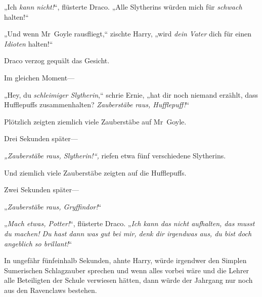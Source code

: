 „Ich \emph{kann nicht!}“, flüsterte Draco. „Alle Slytherins würden mich für \emph{schwach} halten!“

„Und wenn Mr~Goyle rausfliegt,“ zischte Harry, „wird \emph{dein Vater} dich für einen \emph{Idioten} halten!“

Draco verzog gequält das Gesicht.

Im gleichen Moment—

„Hey, du \emph{schleimiger Slytherin},“ schrie Ernie, „hat dir noch niemand erzählt, dass Hufflepuffs zusammenhalten? \emph{Zauberstäbe raus, Hufflepuff!}“

Plötzlich zeigten ziemlich viele Zauberstäbe auf Mr~Goyle.

Drei Sekunden später—

\emph{„Zauberstäbe raus, Slytherin!“,} riefen etwa fünf verschiedene Slytherins.

Und ziemlich viele Zauberstäbe zeigten auf die Hufflepuffs.

Zwei Sekunden später—

„\emph{Zauberstäbe raus, Gryffindor!}“

„\emph{Mach etwas, Potter!}“, flüsterte Draco. „\emph{Ich kann das nicht aufhalten, das musst du machen! Du hast dann was gut bei mir, denk dir irgendwas aus, du bist doch angeblich so brillant!}“

In ungefähr fünfeinhalb Sekunden, ahnte Harry, würde irgendwer den Simplen Sumerischen Schlagzauber sprechen und wenn alles vorbei wäre und die Lehrer alle Beteiligten der Schule verwiesen hätten, dann würde der Jahrgang nur noch aus den Ravenclaws bestehen.

